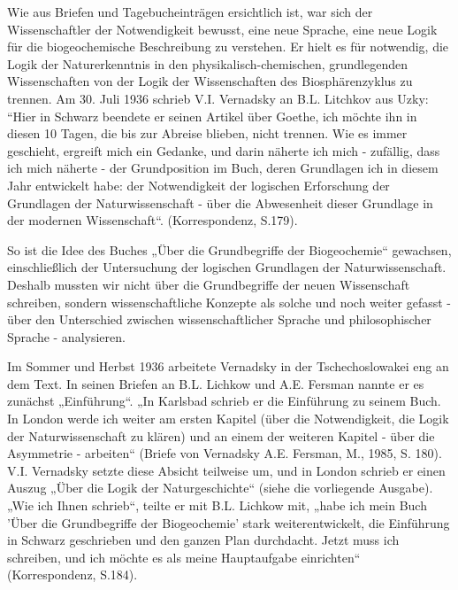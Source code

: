 \documentclass[11pt,a4paper]{article}
\begin{document}
Wie aus Briefen und Tagebucheinträgen ersichtlich ist, war sich der
Wissenschaftler der Notwendigkeit bewusst, eine neue Sprache, eine neue Logik
für die biogeochemische Beschreibung zu verstehen. Er hielt es für notwendig,
die Logik der Naturerkenntnis in den physikalisch-chemischen, grundlegenden
Wissenschaften von der Logik der Wissenschaften des Biosphärenzyklus zu
trennen.  Am 30. Juli 1936 schrieb V.I. Vernadsky an B.L. Litchkov aus Uzky:
“Hier in Schwarz beendete er seinen Artikel über Goethe, ich möchte ihn in
diesen 10 Tagen, die bis zur Abreise blieben, nicht trennen. Wie es immer
geschieht, ergreift mich ein Gedanke, und darin näherte ich mich - zufällig,
dass ich mich näherte - der Grundposition im Buch, deren Grundlagen ich in
diesem Jahr entwickelt habe: der Notwendigkeit der logischen Erforschung der
Grundlagen der Naturwissenschaft - über die Abwesenheit dieser Grundlage in
der modernen Wissenschaft“. (Korrespondenz, S.179).

So ist die Idee des Buches „Über die Grundbegriffe der Biogeochemie“
gewachsen, einschließlich der Untersuchung der logischen Grundlagen der
Naturwissenschaft. Deshalb mussten wir nicht über die Grundbegriffe der neuen
Wissenschaft schreiben, sondern wissenschaftliche Konzepte als solche und noch
weiter gefasst - über den Unterschied zwischen wissenschaftlicher Sprache und
philosophischer Sprache - analysieren.

Im Sommer und Herbst 1936 arbeitete Vernadsky in der Tschechoslowakei eng an
dem Text. In seinen Briefen an B.L. Lichkow und A.E. Fersman nannte er es
zunächst „Einführung“. „In Karlsbad schrieb er die Einführung zu seinem Buch.
In London werde ich weiter am ersten Kapitel (über die Notwendigkeit, die
Logik der Naturwissenschaft zu klären) und an einem der weiteren Kapitel -
über die Asymmetrie - arbeiten“ (Briefe von Vernadsky A.E. Fersman, M., 1985,
S. 180). V.I. Vernadsky setzte diese Absicht teilweise um, und in London
schrieb er einen Auszug „Über die Logik der Naturgeschichte“ (siehe die
vorliegende Ausgabe). „Wie ich Ihnen schrieb“, teilte er mit B.L. Lichkow mit,
„habe ich mein Buch 'Über die Grundbegriffe der Biogeochemie' stark
weiterentwickelt, die Einführung in Schwarz geschrieben und den ganzen Plan
durchdacht. Jetzt muss ich schreiben, und ich möchte es als meine Hauptaufgabe
einrichten“ (Korrespondenz, S.184).
\end{document}
